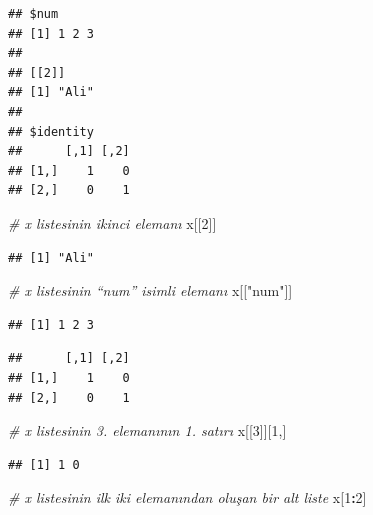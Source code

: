 \documentclass[
]{book}
\newenvironment{Shaded}{\begin{snugshade}}{\end{snugshade}}
\newcommand{\CommentTok}[1]{\textcolor[rgb]{0.56,0.35,0.01}{\textit{#1}}}
\newcommand{\DecValTok}[1]{\textcolor[rgb]{0.00,0.00,0.81}{#1}}
\newcommand{\NormalTok}[1]{#1}
\newcommand{\SpecialCharTok}[1]{\textcolor[rgb]{0.81,0.36,0.00}{\textbf{#1}}}
\newcommand{\StringTok}[1]{\textcolor[rgb]{0.31,0.60,0.02}{#1}}
\begin{document}
\begin{verbatim}
## $num
## [1] 1 2 3
## 
## [[2]]
## [1] "Ali"
## 
## $identity
##      [,1] [,2]
## [1,]    1    0
## [2,]    0    1
\end{verbatim}

\begin{Shaded}
\begin{Highlighting}[]
\CommentTok{\# x listesinin ikinci elemanı}
\NormalTok{x[[}\DecValTok{2}\NormalTok{]]}
\end{Highlighting}
\end{Shaded}

\begin{verbatim}
## [1] "Ali"
\end{verbatim}

\begin{Shaded}
\begin{Highlighting}[]
\CommentTok{\# x listesinin “num” isimli elemanı}
\NormalTok{x[[}\StringTok{"num"}\NormalTok{]]             }
\end{Highlighting}
\end{Shaded}

\begin{verbatim}
## [1] 1 2 3
\end{verbatim}

\begin{Shaded}
\end{Shaded}

\begin{verbatim}
##      [,1] [,2]
## [1,]    1    0
## [2,]    0    1
\end{verbatim}

\begin{Shaded}
\begin{Highlighting}[]
\CommentTok{\# x listesinin 3. elemanının 1. satırı}
\NormalTok{x[[}\DecValTok{3}\NormalTok{]][}\DecValTok{1}\NormalTok{,]}
\end{Highlighting}
\end{Shaded}

\begin{verbatim}
## [1] 1 0
\end{verbatim}

\begin{Shaded}
\begin{Highlighting}[]
\CommentTok{\# x listesinin ilk iki elemanından oluşan bir alt liste}
\NormalTok{x[}\DecValTok{1}\SpecialCharTok{:}\DecValTok{2}\NormalTok{]}
\end{Highlighting}
\end{Shaded}
\end{document}
